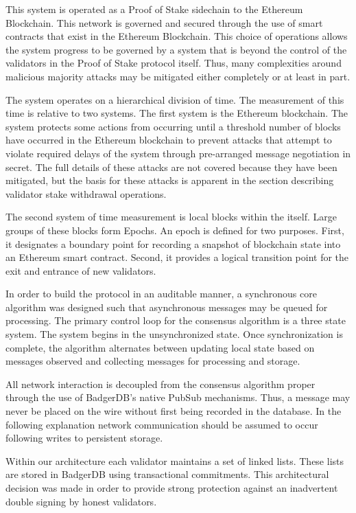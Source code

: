 This system is operated as a Proof of Stake sidechain to the Ethereum
Blockchain.
This network is governed and secured through the use of smart contracts
that exist in the Ethereum Blockchain.
This choice of operations allows the system progress to be governed by
a system that is beyond the control of the validators in the Proof of
Stake protocol itself.
Thus, many complexities around malicious majority attacks may be
mitigated either completely or at least in part.

The system operates on a hierarchical division of time.
The measurement of this time is relative to two systems.
The first system is the Ethereum blockchain.
The system protects some actions from occurring until a threshold
number of blocks have occurred in the Ethereum blockchain to prevent
attacks that attempt to violate required delays of the system through
pre-arranged message negotiation in secret.
The full details of these attacks are not covered because they have
been mitigated, but the basis for these attacks is apparent in the
section describing validator stake withdrawal operations.

The second system of time measurement is local blocks within the
\LayerTwo{} itself.
Large groups of these blocks form Epochs.
An epoch is defined for two purposes.
First, it designates a boundary point for recording a snapshot of
blockchain state into an Ethereum smart contract.
Second, it provides a logical transition point for the exit and
entrance of new validators.

In order to build the protocol in an auditable manner, a synchronous
core algorithm was designed such that asynchronous messages may be
queued for processing.
The primary control loop for the consensus algorithm is a three state
system.
The system begins in the unsynchronized state.
Once synchronization is complete, the algorithm alternates between
updating local state based on messages observed and collecting messages
for processing and storage.

All network interaction is decoupled from the consensus algorithm
proper through the use of BadgerDB's native PubSub mechanisms.
Thus, a message may never be placed on the wire without first being
recorded in the database.
In the following explanation network communication should be assumed to
occur following writes to persistent storage.

Within our architecture each validator maintains a set of linked lists.
These lists are stored in BadgerDB using transactional commitments.
This architectural decision was made in order to provide strong
protection against an inadvertent double signing by honest validators.

